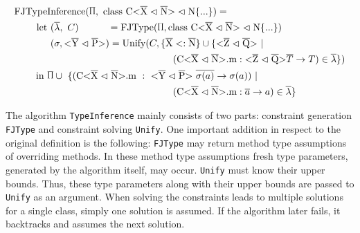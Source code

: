 \begin{align*}
    \text{FJType}&\text{Inference}(\sprod{0.7}, \ \classheader \{ ... \}) = \\
    \text{let} & \ (\overline{\lambda}, \ C) \quad \quad \quad = \text{FJType}(\sprod{0.7}, \classheader \{ ... \}) \\
    & \ (\sigma, \yp) = \text{Unify}(C, \{ \overline{\text{X}} <: \overline{\text{N}} \} \cup \{ \zq \ | \\
    & \quad \quad \quad \quad \quad \quad \quad \quad \quad \quad \quad \quad \quad (\cm : \zq \oto{T} ) \in \overline{\lambda} \} ) \\
    \text{in} \ & \sprod{0.7} \cup \ \{( \cm \ : \ \yp \ \oto{\sigma(a)}) \ | \\
    & \quad \quad \quad \quad \quad \quad \quad \quad \quad \quad \quad \quad \quad (\cm : \oto{a} ) \in \overline{\lambda} \}
\end{align*}

The algorithm \verb|TypeInference| mainly consists of two parts: constraint generation \verb|FJType| and constraint solving \verb|Unify|.
One important addition in respect to the original definition is the following: \verb|FJType| may return method type assumptions of overriding methods. In these method type assumptions fresh type parameters, generated by the algorithm itself, may occur. \verb|Unify| must know their upper bounds. Thus, these type parameters along with their upper bounds are passed to \verb|Unify| as an argument.
When solving the constraints leads to multiple solutions for a single class, simply one solution is assumed. If the algorithm later fails, it backtracks and assumes the next solution.
